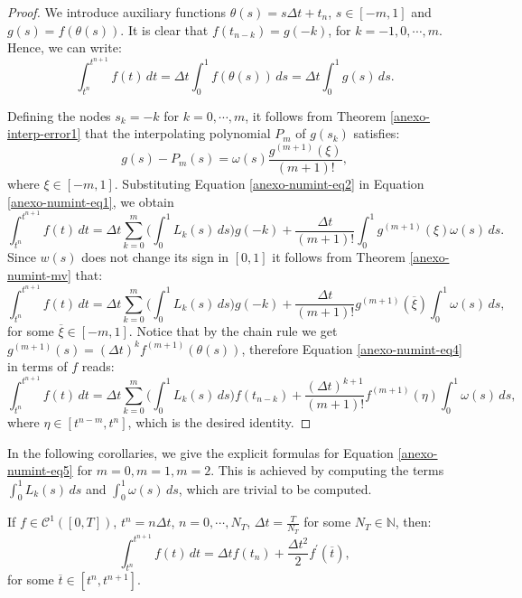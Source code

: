 \begin{proof}
We introduce auxiliary functions $\theta(s) = s\Delta t + t_n$, $s \in [-m,1]$ and $g(s) = f(\theta(s))$.
It is clear that $f(t_{n-k}) = g(-k)$, for $k=-1,0, \cdots, m$.
Hence, we can write:
\begin{equation}
	\label{anexo-numint-eq1}
	\int_{t^n}^{t^{n+1}} f(t)\,dt = \Delta t \int_{0}^{1} f(\theta(s))\,ds = \Delta t \int_{0}^{1} g(s)\,ds.
\end{equation}

Defining the nodes $s_k=-k$ for $k=0, \cdots, m$, it follows from Theorem 
\ref{anexo-interp-error1} that the interpolating polynomial $P_m$ of $g(s_k)$ satisfies:
\begin{equation}
	\label{anexo-numint-eq2}
		g(s)-P_m(s) = \omega(s)\frac{g^{(m+1)}(\xi)}{(m+1)!},
\end{equation}
where $\xi \in [-m,1]$.
Substituting Equation \eqref{anexo-numint-eq2} in Equation \eqref{anexo-numint-eq1}, we obtain
\begin{equation}
	\label{anexo-numint-eq3}
	\int_{t^n}^{t^{n+1}} f(t)\,dt = \Delta t \sum_{k=0}^{m} \bigg(\int_{0}^{1} L_k(s) \,ds \bigg) g(-k)
	+ \frac{\Delta t}{(m+1)!} \int_{0}^{1} g^{(m+1)}(\xi) \omega(s)\,ds.
\end{equation}
Since $w(s)$ does not change its sign in $[0,1]$ it follows from Theorem \ref{anexo-numint-mv} that:
\begin{equation}
	\label{anexo-numint-eq4}
	\int_{t^n}^{t^{n+1}} f(t)\,dt = \Delta t \sum_{k=0}^{m} \bigg(\int_{0}^{1} L_k(s) \,ds \bigg) g(-k)
	+ \frac{\Delta t}{(m+1)!} g^{(m+1)}(\overline{\xi})\int_{0}^{1} \omega(s)\,ds, 
\end{equation}
for some $\overline{\xi} \in [-m,1]$. 
Notice that by the chain rule we get $g^{(m+1)}(s) = (\Delta t)^k f^{(m+1)}(\theta(s))$, therefore
Equation \eqref{anexo-numint-eq4} in terms of $f$ reads:
\begin{equation}
	\label{anexo-numint-eq5}
	\int_{t^n}^{t^{n+1}} f(t)\,dt = \Delta t \sum_{k=0}^{m} \bigg(\int_{0}^{1} L_k(s) \,ds \bigg) f(t_{n-k})
	+ \frac{(\Delta t)^{k+1}}{(m+1)!} f^{(m+1)}({\eta})\int_{0}^{1} \omega(s)\,ds, 
\end{equation}
where $\eta \in [t^{n-m},t^n]$, which is the desired identity.
\end{proof}

In the following corollaries, we give the explicit formulas for Equation \eqref{anexo-numint-eq5}
for $m=0,m=1,m=2$. This is achieved by computing the terms $\int_{0}^{1} L_k(s) \,ds$ and $\int_{0}^{1} \omega(s)\,ds$,
which are trivial to be computed.
\begin{corollary}
	\label{anexo-numint-col1}
	If $f\in \mathcal{C}^1([0,T])$, $t^n = n\Delta t$, $n=0, \cdots, N_T$, $\Delta t = \frac{T}{N_T}$ for some 
	$N_T \in \mathbb{N}$, then:
	\begin{equation}
		\int_{t^n}^{t^{n+1}} f(t)\,dt = \Delta t  f(t_{n})
		+ \frac{\Delta t^{2}}{2} f^{'}(\overline{t}),
	\end{equation}
for some $\overline{t} \in [t^n, t^{n+1}]$.
\end{corollary}

